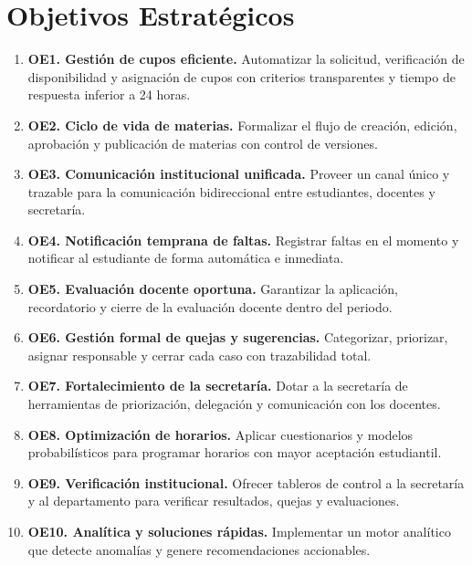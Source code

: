 \section{Objetivos Estratégicos}

\begin{enumerate}[leftmargin=1.4cm, itemsep=5pt]
  \item \textbf{OE1. Gestión de cupos eficiente.} Automatizar la solicitud,
        verificación de disponibilidad y asignación de cupos con criterios
        transparentes y tiempo de respuesta inferior a 24 horas.

  \item \textbf{OE2. Ciclo de vida de materias.} Formalizar el flujo de creación,
        edición, aprobación y publicación de materias con control de versiones.

  \item \textbf{OE3. Comunicación institucional unificada.} Proveer un canal
        único y trazable para la comunicación bidireccional entre estudiantes,
        docentes y secretaría.

  \item \textbf{OE4. Notificación temprana de faltas.} Registrar faltas en el
        momento y notificar al estudiante de forma automática e inmediata.

  \item \textbf{OE5. Evaluación docente oportuna.} Garantizar la aplicación,
        recordatorio y cierre de la evaluación docente dentro del periodo.

  \item \textbf{OE6. Gestión formal de quejas y sugerencias.} Categorizar,
        priorizar, asignar responsable y cerrar cada caso con trazabilidad total.

  \item \textbf{OE7. Fortalecimiento de la secretaría.} Dotar a la secretaría de
        herramientas de priorización, delegación y comunicación con los docentes.

  \item \textbf{OE8. Optimización de horarios.} Aplicar cuestionarios y modelos
        probabilísticos para programar horarios con mayor aceptación estudiantil.

  \item \textbf{OE9. Verificación institucional.} Ofrecer tableros de control a
        la secretaría y al departamento para verificar resultados, quejas y
        evaluaciones.

  \item \textbf{OE10. Analítica y soluciones rápidas.} Implementar un motor
        analítico que detecte anomalías y genere recomendaciones accionables.
\end{enumerate}

